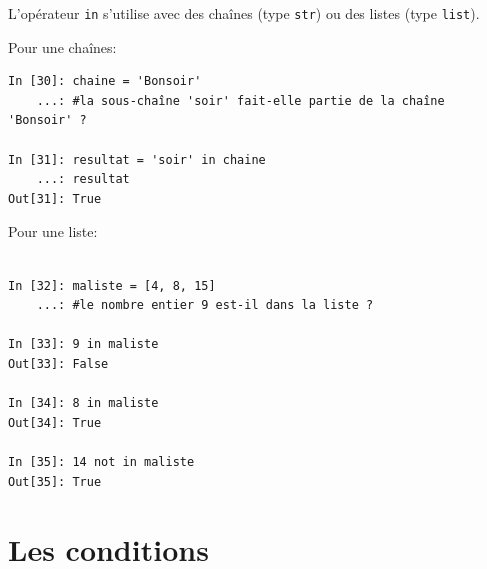 \documentclass{beamer}
\begin{document}
\begin{frame}

L'opérateur \texttt{in} s'utilise avec des chaînes (type \texttt{str}) ou des listes (type \texttt{list}).

Pour une chaînes:
\begin{verbatim}
In [30]: chaine = 'Bonsoir'
    ...: #la sous-chaîne 'soir' fait-elle partie de la chaîne 'Bonsoir' ?

In [31]: resultat = 'soir' in chaine
    ...: resultat
Out[31]: True
\end{verbatim}
\end{frame}

\begin{frame}

Pour une liste:

\begin{verbatim}

In [32]: maliste = [4, 8, 15]
    ...: #le nombre entier 9 est-il dans la liste ?

In [33]: 9 in maliste
Out[33]: False

In [34]: 8 in maliste
Out[34]: True

In [35]: 14 not in maliste
Out[35]: True
\end{verbatim}
\end{frame}

\section{Les conditions}
\end{document}
